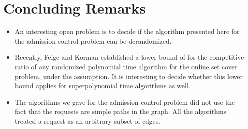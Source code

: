 \documentclass{sig-alternate}
\begin{document}
\section{Concluding Remarks}\label{sec:conclude}

\begin{itemize}
    \item An interesting open problem is to decide if the algorithm presented here
    for the admission control problem can be derandomized.
    \item Recently, Feige and Korman established a lower bound of 
    for the competitive ratio of any randomized polynomial time algorithm for the
    online set cover problem, under the  assumption. It is interesting to
    decide whether this lower bound applies for superpolynomial time algorithms as well.
    \item The algorithms we gave for the admission control problem did not use
    the fact that the requests are simple paths in the graph. All
    the algorithms treated a request as an arbitrary subset of
    edges.

\end{itemize}
\end{document}
